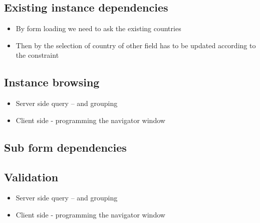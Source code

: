 






\subsection{Existing instance dependencies}



\begin{itemize}
	\item	By form loading we need to ask the existing countries
	\item 	Then by the selection of country of other field has to be updated according to the constraint
\end{itemize}


\subsection{Instance browsing}


\begin{itemize}
	\item Server side query – and grouping
	\item Client side - programming the navigator window
\end{itemize}

\subsection{Sub form dependencies}
	




\subsection{Validation}
	
\begin{itemize}
	\item Server side query – and grouping
	\item Client side - programming the navigator window
\end{itemize}	
	
